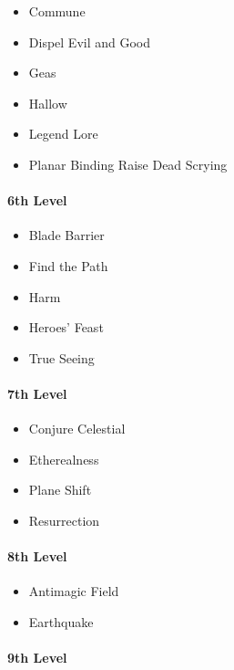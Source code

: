 \begin{itemize}
\item
  Commune
\item
  Dispel Evil and Good
\item
  Geas
\item
  Hallow
\item
  Legend Lore
\item
  Planar Binding Raise Dead Scrying
\end{itemize}

\paragraph{6th Level}\label{Cleric_Spells_6th-level}

\begin{itemize}
\item
  Blade Barrier
\item
  Find the Path
\item
  Harm
\item
  Heroes' Feast
\item
  True Seeing
\end{itemize}

\paragraph{7th Level}\label{Cleric_Spells_7th-level}

\begin{itemize}
\item
  Conjure Celestial
\item
  Etherealness
\item
  Plane Shift
\item
  Resurrection
\end{itemize}

\paragraph{8th Level}\label{Cleric_Spells_8th-level}

\begin{itemize}
\item
  Antimagic Field
\item
  Earthquake
\end{itemize}

\paragraph{9th Level}\label{Cleric_Spells_9th-level}

